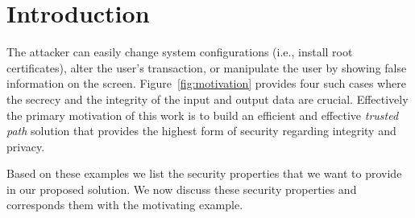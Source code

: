 \section{Introduction}
\label{sec:intro}




 The attacker can easily change system configurations (i.e., install root certificates), alter the user's transaction, or manipulate the user by showing false information on the screen. Figure~\ref{fig:motivation} provides four such cases where the secrecy and the integrity of the input and output data are crucial. Effectively the primary motivation of this work is to build an efficient and effective \emph{trusted path} solution that provides the highest form of security regarding integrity and privacy. 

Based on these examples we list the security properties that we want to provide in our proposed solution. We now discuss these security properties and corresponds them with the motivating example.

